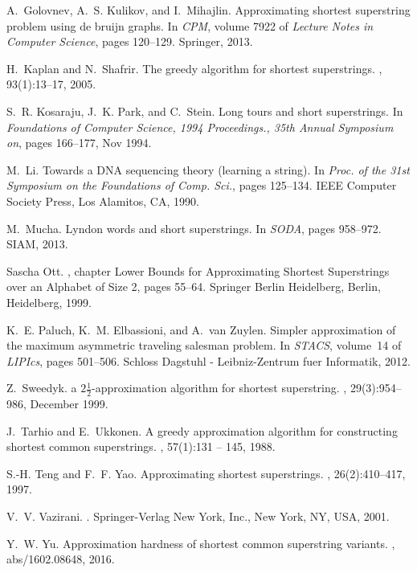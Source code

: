 \documentclass[10pt]{article}
\begin{document}
{\begin{thebibliography}{10}
A.~Golovnev, A.~S. Kulikov, and I.~Mihajlin.
\newblock Approximating shortest superstring problem using de bruijn graphs.
\newblock In {\em {CPM}}, volume 7922 of {\em Lecture Notes in Computer
  Science}, pages 120--129. Springer, 2013.

H.~Kaplan and N.~Shafrir.
\newblock The greedy algorithm for shortest superstrings.
, 93(1):13--17, 2005.

S.~R. Kosaraju, J.~K. Park, and C.~Stein.
\newblock Long tours and short superstrings.
\newblock In {\em Foundations of Computer Science, 1994 Proceedings., 35th
  Annual Symposium on}, pages 166--177, Nov 1994.

M.~Li.
\newblock Towards a {DNA} sequencing theory (learning a string).
\newblock In {\em Proc. of the 31st Symposium on the Foundations of Comp.
  Sci.}, pages 125--134. IEEE Computer Society Press, Los Alamitos, CA, 1990.

M.~Mucha.
\newblock Lyndon words and short superstrings.
\newblock In {\em {SODA}}, pages 958--972. {SIAM}, 2013.

Sascha Ott.
, chapter
  Lower Bounds for Approximating Shortest Superstrings over an Alphabet of Size
  2, pages 55--64.
\newblock Springer Berlin Heidelberg, Berlin, Heidelberg, 1999.

K.~E. Paluch, K.~M. Elbassioni, and A.~van Zuylen.
\newblock Simpler approximation of the maximum asymmetric traveling salesman
  problem.
\newblock In {\em {STACS}}, volume~14 of {\em LIPIcs}, pages 501--506. Schloss
  Dagstuhl - Leibniz-Zentrum fuer Informatik, 2012.

Z.~Sweedyk.
\newblock \boldmath a $2\frac 12$-approximation algorithm for shortest
  superstring.
, 29(3):954--986, December 1999.

J.~Tarhio and E.~Ukkonen.
\newblock A greedy approximation algorithm for constructing shortest common
  superstrings.
, 57(1):131 -- 145, 1988.

S.-H. Teng and F.~F. Yao.
\newblock Approximating shortest superstrings.
, 26(2):410--417, 1997.

V.~V. Vazirani.
.
\newblock Springer-Verlag New York, Inc., New York, NY, USA, 2001.

Y.~W. Yu.
\newblock Approximation hardness of shortest common superstring variants.
, abs/1602.08648, 2016.

\end{thebibliography}


}
\end{document}
